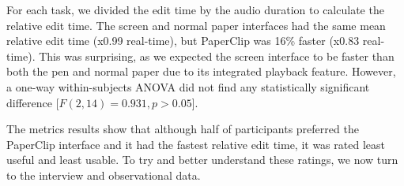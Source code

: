 
For each task, we divided the edit time by the audio duration to calculate the relative edit time.  The screen and
normal paper interfaces had the same mean relative edit time (x0.99 real-time), but PaperClip was 16\% faster (x0.83
real-time).  This was surprising, as we expected the screen interface to be faster than both the pen and normal paper
due to its integrated playback feature.  However, a one-way within-subjects ANOVA did not find any statistically
significant difference [$F(2,14) = 0.931, p > 0.05$].

The metrics results show that although half of participants preferred the PaperClip interface and it had the fastest
relative edit time, it was rated least useful and least usable. 
To try and better understand these ratings, we now turn to the interview and observational
data.






